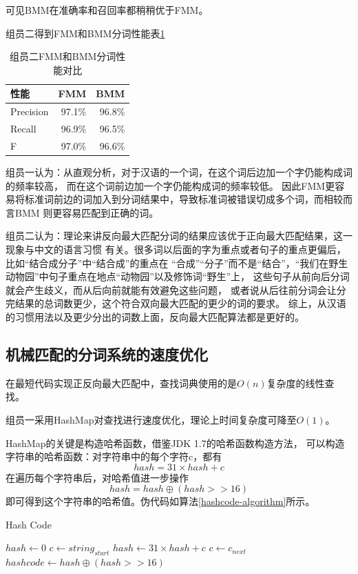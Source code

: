 可见BMM在准确率和召回率都稍稍优于FMM。

组员二得到FMM和BMM分词性能表\ref{seg_evaluate_zjb}

\begin{table}[H]
  \centering
  \begin{tabular}{lrr}
    \hline
    \textbf{性能} & \textbf{FMM} & \textbf{BMM} \\
    \hline
    Precision     & 97.1\%       & 96.8\%       \\
    Recall        & 96.9\%       & 96.5\%       \\
    F             & 97.0\%       & 96.6\%       \\
    \hline
  \end{tabular}
  \caption{组员二FMM和BMM分词性能对比}
  \label{seg_evaluate_zjb}
\end{table}

组员一认为：从直观分析，对于汉语的一个词，在这个词后边加一个字仍能构成词的频率较高，
而在这个词前边加一个字仍能构成词的频率较低。
因此FMM更容易将标准词前边的词加入到分词结果中，导致标准词被错误切成多个词，而相较而言BMM
则更容易匹配到正确的词。

组员二认为：理论来讲反向最大匹配分词的结果应该优于正向最大匹配结果，这一现象与中文的语言习惯
有关。很多词以后面的字为重点或者句子的重点更偏后，比如“结合成分子”中“结合成”的重点在
“合成”“分子”而不是“结合”，“我们在野生动物园”中句子重点在地点“动物园”以及修饰词“野生”上，
这些句子从前向后分词就会产生歧义，而从后向前就能有效避免这些问题，
或者说从后往前分词会让分完结果的总词数更少，这个符合双向最大匹配的更少的词的要求。
综上，从汉语的习惯用法以及更少分出的词数上面，反向最大匹配算法都是更好的。

\subsection{机械匹配的分词系统的速度优化}

在最短代码实现正反向最大匹配中，查找词典使用的是$O(n)$复杂度的线性查找。

组员一采用HashMap对查找进行速度优化，理论上时间复杂度可降至$O(1)$。

HashMap的关键是构造哈希函数，借鉴JDK 1.7的哈希函数构造方法，
可以构造字符串的哈希函数：对字符串中的每个字符c，都有
\begin{equation}
  \label{hash31}
  hash = 31 \times hash + c
\end{equation}
在遍历每个字符串后，对哈希值进一步操作
\begin{equation}
  hash = hash \oplus (hash >> 16)
\end{equation}
即可得到这个字符串的哈希值。伪代码如算法\ref{hashcode-algorithm}所示。
\begin{algorithm}
  \caption{Hash Code}
  \begin{algorithmic}
    \STATE $hash \gets 0$
    \STATE $c \gets string_{start}$
    \STATE $hash \gets 31 \times hash + c$
    \STATE $c \gets c_{next}$
    \ENDWHILE
    \STATE $hashcode \gets hash \oplus (hash >> 16)$
  \end{algorithmic}
  \label{hashcode-algorithm}
\end{algorithm}

